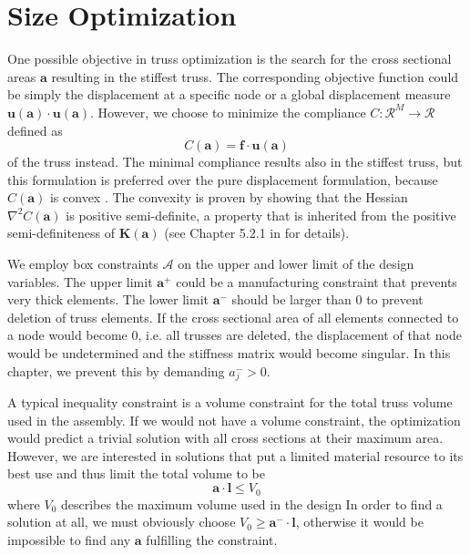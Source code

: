 \section{Size Optimization}
One possible objective in truss optimization is the search for the cross sectional areas $\mathbf{a}$ resulting in the stiffest truss. The corresponding objective function could be simply the displacement at a specific node or a global displacement measure $\mathbf{u} (\mathbf{a}) \cdot \mathbf{u} (\mathbf{a})$. However, we choose to minimize the compliance $C: \mathcal{R}^{M} \rightarrow \mathcal{R}$ defined as 
\begin{equation}
    C(\mathbf{a}) = \mathbf{f} \cdot \mathbf{u}(\mathbf{a})
\end{equation} 
of the truss instead. The minimal compliance results also in the stiffest truss, but this formulation is preferred over the pure displacement formulation, because $C(\mathbf{a})$ is convex \cite{Svanberg1984}. The convexity is proven by showing that the Hessian $\nabla^2 C(\mathbf{a})$ is positive semi-definite, a property that is inherited from the positive semi-definiteness of $\mathbf{K}(\mathbf{a})$ (see Chapter 5.2.1 in \cite{Christensen2008} for details).

We employ box constraints $\mathcal{A}$ on the upper and lower limit of the design variables. The upper limit $\mathbf{a}^+$ could be a manufacturing constraint that prevents very thick elements. The lower limit $\mathbf{a}^-$ should be larger than $0$ to prevent deletion of truss elements. If the cross sectional area of all elements connected to a node would become $0$, i.e. all trusses are deleted, the displacement of that node would be undetermined and the stiffness matrix would become singular. In this chapter, we prevent this by demanding $a_j^- > 0$.

A typical inequality constraint is a volume constraint for the total truss volume used in the assembly. If we would not have a volume constraint, the optimization would predict a trivial solution with all cross sections at their maximum area. However, we are interested in solutions that put a limited material resource to its best use and thus limit the total volume to be 
\begin{equation}
    \mathbf{a} \cdot \mathbf{l} \le V_0
\end{equation}
where $V_0$ describes the maximum volume used in the design
In order to find a solution at all, we must obviously choose $V_0 \ge \mathbf{a}^- \cdot \mathbf{l}$, otherwise it would be impossible to find any $\mathbf{a}$ fulfilling the constraint. 

